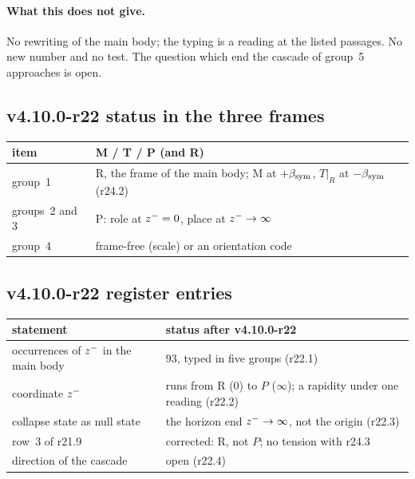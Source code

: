\paragraph{What this does not give.}
No rewriting of the main body; the typing is a reading at the listed passages.  No new number and no test.  The question which end
the cascade of group~5 approaches is open.

\subsection*{v4.10.0-r22 status in the three frames}
\label{subsec:v4100-r22-frames}

\begin{center}
\small
\begin{tabular}{@{}>{\raggedright\arraybackslash}p{}>{\raggedright\arraybackslash}p{}@{}}
\toprule
item & M / T / P (and R)\\
\midrule
group~1 & R, the frame of the main body; M at \(+\beta_{\mathrm{sym}}\), \(T|_R\) at \(-\beta_{\mathrm{sym}}\) (r24.2)\\
groups~2 and 3 & P: role at \(z^-=0\), place at \(z^-\to\infty\)\\
group~4 & frame-free (scale) or an orientation code\\
\bottomrule
\end{tabular}
\end{center}

\subsection*{v4.10.0-r22 register entries}
\label{subsec:v4100-r22-register}

\begin{center}
\small
\begin{tabular}{@{}>{\raggedright\arraybackslash}p{}>{\raggedright\arraybackslash}p{}@{}}
\toprule
statement & status after v4.10.0-r22\\
\midrule
occurrences of \(z^-\) in the main body & \(93\), typed in five groups (r22.1)\\
coordinate \(z^-\) & runs from R (\(0\)) to \(P\) (\(\infty\)); a rapidity under one reading (r22.2)\\
collapse state as null state & the horizon end \(z^-\to\infty\), not the origin (r22.3)\\
row~3 of r21.9 & corrected: R, not \(P\); no tension with r24.3\\
direction of the cascade & open (r22.4)\\
\bottomrule
\end{tabular}
\end{center}

